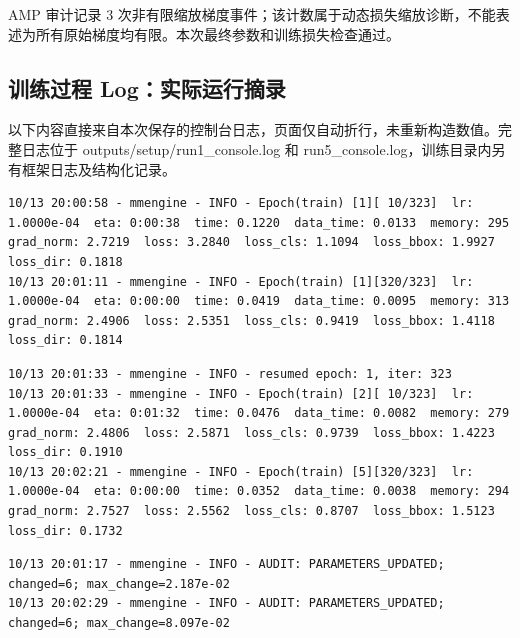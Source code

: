 \documentclass[UTF8,zihao=-4,fontset=windows]{ctexart}
\begin{document}
{\small AMP 审计记录 3 次非有限缩放梯度事件；该计数属于动态损失缩放诊断，不能表述为所有原始梯度均有限。本次最终参数和训练损失检查通过。\par}


\FloatBarrier

\subsection{训练过程 Log：实际运行摘录}

以下内容直接来自本次保存的控制台日志，页面仅自动折行，未重新构造数值。完整日志位于 outputs/\allowbreak{}setup/\allowbreak{}run1\_console.log 和 run5\_console.log，训练目录内另有框架日志及结构化记录。


\begin{lstlisting}[caption={首轮训练：第 10 和第 320 个批次。}]
10/13 20:00:58 - mmengine - INFO - Epoch(train) [1][ 10/323]  lr: 1.0000e-04  eta: 0:00:38  time: 0.1220  data_time: 0.0133  memory: 295  grad_norm: 2.7219  loss: 3.2840  loss_cls: 1.1094  loss_bbox: 1.9927  loss_dir: 0.1818
10/13 20:01:11 - mmengine - INFO - Epoch(train) [1][320/323]  lr: 1.0000e-04  eta: 0:00:00  time: 0.0419  data_time: 0.0095  memory: 313  grad_norm: 2.4906  loss: 2.5351  loss_cls: 0.9419  loss_bbox: 1.4118  loss_dir: 0.1814
\end{lstlisting}

\begin{lstlisting}[caption={断点恢复：恢复到 epoch=1、iter=323，继续第 2 轮并完成第 5 轮。}]
10/13 20:01:33 - mmengine - INFO - resumed epoch: 1, iter: 323
10/13 20:01:33 - mmengine - INFO - Epoch(train) [2][ 10/323]  lr: 1.0000e-04  eta: 0:01:32  time: 0.0476  data_time: 0.0082  memory: 279  grad_norm: 2.4806  loss: 2.5871  loss_cls: 0.9739  loss_bbox: 1.4223  loss_dir: 0.1910
10/13 20:02:21 - mmengine - INFO - Epoch(train) [5][320/323]  lr: 1.0000e-04  eta: 0:00:00  time: 0.0352  data_time: 0.0038  memory: 294  grad_norm: 2.7527  loss: 2.5562  loss_cls: 0.8707  loss_bbox: 1.5123  loss_dir: 0.1732
\end{lstlisting}

\begin{lstlisting}[caption={两段训练的参数更新审计原文。}]
10/13 20:01:17 - mmengine - INFO - AUDIT: PARAMETERS_UPDATED; changed=6; max_change=2.187e-02
10/13 20:02:29 - mmengine - INFO - AUDIT: PARAMETERS_UPDATED; changed=6; max_change=8.097e-02
\end{lstlisting}
\end{document}

